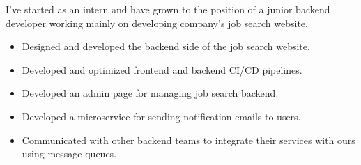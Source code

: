 I’ve started as an intern and have grown to the position of a junior backend 
developer working mainly on developing company’s job search website. 

\begin{itemize}
    \item Designed and developed the backend side of the job search website.
    \item Developed and optimized frontend and backend CI/CD pipelines.
    \item Developed an admin page for managing job search backend.
    \item Developed a microservice for sending notification emails to users.
    \item Communicated with other backend teams to integrate their 
            services with ours using message queues. 
\end{itemize}